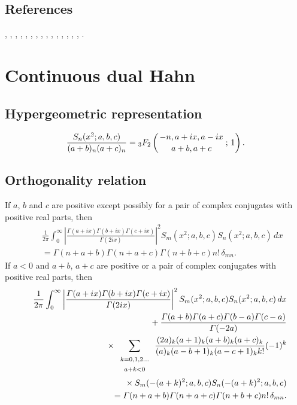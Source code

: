 \documentclass[envcountchap,graybox]{svmono}
\newcommand{\hyp}[5]{\mbox{}_{#1}{F}_{#2}
\left(\genfrac{}{}{0pt}{}{#3}{#4}\,;\,#5\right)}
\newcommand{\mathindent}{\hspace{7.5mm}}
\renewcommand{\Gamma}{\varGamma}
\newcommand{\hyp}[5]{\,\mbox{}_{#1}F_{#2}\!\left(
  \genfrac{}{}{0pt}{}{#3}{#4};#5\right)}
\begin{document}
\subsection*{References}
\cite{Askey89I}, \cite{AskeyWilson79}, \cite{AskeyWilson85},
\cite{AtakRahmanSuslov}, \cite{AtakSuslov88}, \cite{Dunkl84},
\cite{Koorn88}, \cite{Lesky93}, \cite{Lesky95II}, \cite{LeskyWaibel},
\cite{Nikiforov+}, \cite{NikiforovUvarov}, \cite{Perlstadt}, \cite{Rahman80}, 
\cite{Rahman81II}, \cite{Wilson80}.


\section{Continuous dual Hahn}

\par\setcounter{equation}{0}

\subsection*{Hypergeometric representation}
\begin{equation}
\label{DefContDualHahn}
\frac{S_n(x^2;a,b,c)}{(a+b)_n(a+c)_n}=\hyp{3}{2}{-n,a+ix,a-ix}{a+b,a+c}{1}.
\end{equation}

\subsection*{Orthogonality relation}
If $a$, $b$ and $c$ are positive except possibly for a pair of complex conjugates with positive real parts, then
\begin{eqnarray}
\label{OrtIContDualHahn}
& &\frac{1}{2\pi}\int_0^{\infty}\left|\frac{\Gamma(a+ix)\Gamma(b+ix)\Gamma(c+ix)}{\Gamma(2ix)}\right|^2
S_m(x^2;a,b,c)S_n(x^2;a,b,c)\,dx\nonumber\\
& &{}=\Gamma(n+a+b)\Gamma(n+a+c)\Gamma(n+b+c)n!\,\delta_{mn}.
\end{eqnarray}
If $a<0$ and $a+b$, $a+c$ are positive or a pair of complex conjugates
with positive real parts, then
\begin{eqnarray}
\label{OrtIIContDualHahn}
& &\frac{1}{2\pi}\int_0^{\infty}\left|\frac{\Gamma(a+ix)\Gamma(b+ix)\Gamma(c+ix)}{\Gamma(2ix)}\right|^2
S_m(x^2;a,b,c)S_n(x^2;a,b,c)\,dx\nonumber\\
& &{}\mathindent{}+\frac{\Gamma(a+b)\Gamma(a+c)\Gamma(b-a)\Gamma(c-a)}{\Gamma(-2a)}\nonumber\\
& &{}\mathindent\mathindent{}\times\sum_{\begin{array}{c}
{\scriptstyle k=0,1,2\ldots}\\{\scriptstyle a+k<0}\end{array}}
\frac{(2a)_k(a+1)_k(a+b)_k(a+c)_k}{(a)_k(a-b+1)_k(a-c+1)_kk!}(-1)^k\nonumber\\
& &{}\mathindent\mathindent\mathindent\mathindent{}\times S_m(-(a+k)^2;a,b,c)S_n(-(a+k)^2;a,b,c)\nonumber\\
& &{}=\Gamma(n+a+b)\Gamma(n+a+c)\Gamma(n+b+c)n!\,\delta_{mn}.
\end{eqnarray}
\end{document}
